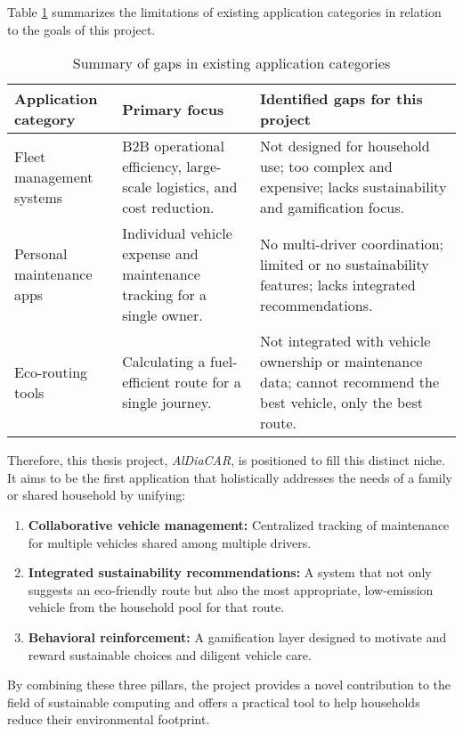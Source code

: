 Table \ref{tab:gap_analysis} summarizes the limitations of existing application categories in relation to the goals of this project.

\begin{table}[h!]
    \centering
    \label{tab:gap_analysis}
    \begin{tabular}{p{}|p{}|p{}}
        \hline
        \textbf{Application category} & \textbf{Primary focus} & \textbf{Identified gaps for this project} \\
        \hline
        Fleet management systems & B2B operational efficiency, large-scale logistics, and cost reduction. & Not designed for household use; too complex and expensive; lacks sustainability and gamification focus. \\
        \hline
        Personal maintenance apps & Individual vehicle expense and maintenance tracking for a single owner. & No multi-driver coordination; limited or no sustainability features; lacks integrated recommendations. \\
        \hline
        Eco-routing tools & Calculating a fuel-efficient route for a single journey. & Not integrated with vehicle ownership or maintenance data; cannot recommend the best vehicle, only the best route. \\
        \hline
    \end{tabular}
    \caption{Summary of gaps in existing application categories}
\end{table}

Therefore, this thesis project, \textit{AlDiaCAR}, is positioned to fill this distinct niche. It aims to be the first application that holistically addresses the needs of a family or shared household by unifying:
\begin{enumerate}
    \item \textbf{Collaborative vehicle management:} Centralized tracking of maintenance for multiple vehicles shared among multiple drivers.
    \item \textbf{Integrated sustainability recommendations:} A system that not only suggests an eco-friendly route but also the most appropriate, low-emission vehicle from the household pool for that route.
    \item \textbf{Behavioral reinforcement:} A gamification layer designed to motivate and reward sustainable choices and diligent vehicle care.
\end{enumerate}

By combining these three pillars, the project provides a novel contribution to the field of sustainable computing and offers a practical tool to help households reduce their environmental footprint.
